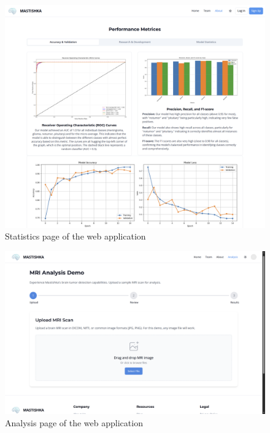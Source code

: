 \begin{figure}[H]
    \centering
    \includegraphics[width=0.8\linewidth]{App/stats2.png}
    \caption{Statistics page of the web application}
    \label{fig:stats2_page}
\end{figure}

\begin{figure}[H]
    \centering
    \includegraphics[width=0.9\linewidth]{App/analysis.png}
    \caption{Analysis page of the web application}
    \label{fig:analysis_page}
\end{figure}

